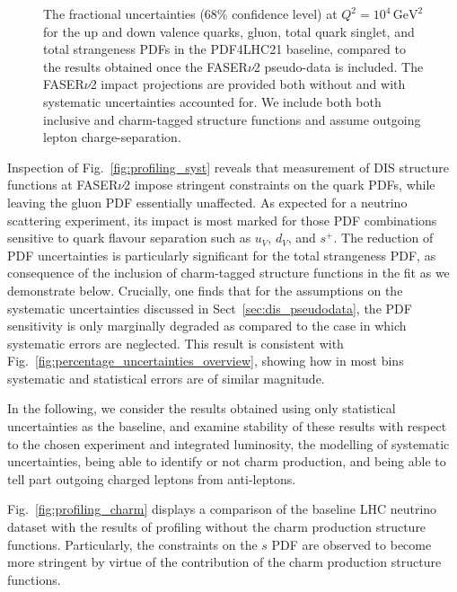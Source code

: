 \begin{figure}[t]
\caption{
The fractional uncertainties (68\% confidence level) at $Q^2 = 10^4 \, \textrm{GeV}^2$ 
for the up and down valence quarks, gluon, total quark singlet, and total strangeness PDFs
in the PDF4LHC21 baseline, compared to the results obtained once the FASER$\nu$2 pseudo-data is included.
%
The FASER$\nu$2 impact projections are provided both without and with systematic
uncertainties accounted for.
%
We include both  both  inclusive and charm-tagged structure functions
and assume outgoing lepton charge-separation.
%
}
\label{fig:FASERnu2_baseline}
\end{figure}

Inspection of Fig.~\ref{fig:profiling_syst} reveals that measurement of DIS structure
functions at FASER$\nu$2 impose stringent constraints on the quark PDFs, while leaving
the gluon PDF essentially unaffected.
%
As expected for a neutrino scattering experiment, its impact is most marked for
those PDF combinations sensitive to quark flavour separation such as $u_V$, $d_V$, and
$s^+$.
%
The reduction of PDF uncertainties is particularly significant for the total strangeness PDF,
as  consequence of the inclusion of charm-tagged structure functions in the fit as we demonstrate below.
%
Crucially, one finds that for the assumptions on the systematic uncertainties
discussed in Sect~\ref{sec:dis_pseudodata}, the PDF sensitivity is only marginally degraded
as compared to the case in which systematic errors are neglected.
%
This result is consistent with Fig.~\ref{fig:percentage_uncertainties_overview}, showing
how in most bins systematic and statistical errors are of similar magnitude.

In the following, we consider the results obtained using only statistical uncertainties as the baseline, 
and examine stability of these results with respect to the chosen experiment and integrated luminosity, the modelling of systematic
uncertainties, being able to identify or not charm production, and being able to tell part outgoing
charged leptons from anti-leptons.


%
Fig.~\ref{fig:profiling_charm} displays a comparison of the baseline LHC neutrino dataset with the results
of profiling without the charm production structure functions. 
Particularly, the constraints on the $s$ PDF are observed to become more stringent 
by virtue of the contribution of the charm production structure functions.

